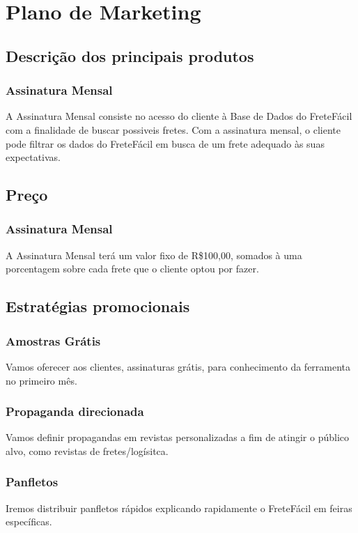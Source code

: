 \chapter{Plano de Marketing}\label{marketing}

\section{Descrição dos principais produtos}

\subsection{Assinatura Mensal}
A Assinatura Mensal consiste no acesso do cliente à Base de Dados do FreteFácil com a finalidade de buscar possiveis fretes. Com a assinatura mensal, o cliente pode filtrar os dados do FreteFácil em busca de um frete adequado às suas expectativas.

\section{Preço}

\subsection{Assinatura Mensal}
A Assinatura Mensal terá um valor fixo de R\$100,00, somados à uma porcentagem sobre cada frete que o cliente optou por fazer.

\section{Estratégias promocionais}
\subsection{Amostras Grátis}
Vamos oferecer aos clientes, assinaturas grátis, para conhecimento da ferramenta no primeiro mês.

\subsection{Propaganda direcionada}
Vamos definir propagandas em revistas personalizadas a fim de atingir o público alvo, como revistas de fretes/logísitca.

\subsection{Panfletos}
Iremos distribuir panfletos rápidos explicando rapidamente o FreteFácil em feiras específicas.

